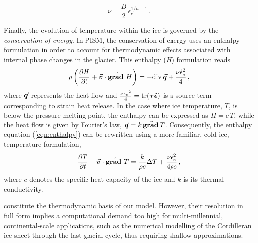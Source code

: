 \documentclass{article}
\newcommand{\vect}[1]{\va*{#1}} %
\newcommand{\tens}[1]{\vb*{#1}} %
\renewcommand{\div}[1]{\mathrm{div}\,#1}            %
\renewcommand{\grad}[1]{\vect{\mathrm{grad}}\,#1}   %
\newcommand{\matdv}[1]{\pdv{#1}{t}+\vect{v}\cdot\grad{}\,#1}  %
\newcommand{\doteps}[0]{\dot{\epsilon}} %
\newcommand{\DST}[0]{\tens{\tau}}       %
\newcommand{\SRT}[0]{\tens{\doteps}}    %
\begin{document}
\begin{equation}
    \label{eqn:viscosity}
    \nu = \frac{B}{2}\,\doteps_e^{1/n-1} \,.
\end{equation}

Finally, the evolution of temperature within the ice is governed by the
\emph{conservation of energy}. In PISM, the conservation of energy uses an
enthalpy formulation in order to account for thermodynamic effects associated
with internal phase changes in the glacier. This enthalpy ($H$) formulation
reads
\begin{equation}
    \label{eqn:enthalpy}
    \rho \left(\matdv{H}\right)
        = -\div{\vect{q}} + \frac{\nu\doteps_e^2}{4} \,,
\end{equation}
where $\vect{q}$ represents the heat flow and
${\frac{\nu\dot{\epsilon_e}^2}{4} = \tr(\DST\SRT)}$ is a
source term corresponding to strain heat release. In the case where ice
temperature, $T$, is below the pressure-melting point, the enthalpy can be
expressed as $H=c\,T$, while the heat flow is given by Fourier's law,
$\vect{q} = k\,\grad{T}$. Consequently, the enthalpy equation
(\ref{eqn:enthalpy}) can be rewritten using a more familiar, cold-ice,
temperature formulation,
\begin{equation}
    \label{eqn:temperature}
    \matdv{T} = \frac{k}{\rho c} \Delta T
                + \frac{\nu\doteps_e^2}{4\rho c} \,,
\end{equation}
where $c$ denotes the specific heat capacity of the ice and $k$ is its thermal
conductivity.

constitute the thermodynamic basis
of our model. However, their resolution in full form implies a computational
demand too high for multi-millennial, continental-scale applications, such as
the numerical modelling of the Cordilleran ice sheet through the last glacial
cycle, thus requiring shallow approximations.
\end{document}
